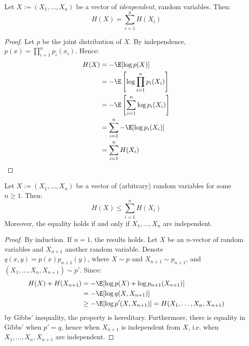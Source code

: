 \documentclass{../cs-classes/cs-classes}
\begin{document}
\begin{property}
    Let $X:=(X_1, \dots, X_n)$ be a vector of \emph{idenpendent}, random variables. Then:
    \begin{equation}
        H(X)=\sum_{i=1}^n H(X_i)
    \end{equation}
\end{property}

\begin{proof}
    Let $p$ be the joint distribution of $X$. By independence, $p(x)=\prod_{i=1}^n p_i(x_i)$. Hence:
    \begin{equation*}
        \begin{aligned}
            H(X)&=-\E[\log p(X)]\\
            &=-\E\left[\log\prod_{i=1}^n p_i(X_i)\right]\\
            &=-\E\left[\sum_{i=1}^n\log p_i(X_i)\right]\\
            &=\sum_{i=1}^n-\E[\log p_i(X_i)]\\
            &=\sum_{i=1}^n H(X_i)
        \end{aligned}
    \end{equation*}
\end{proof}

\begin{property}
    Let $X:=(X_1, \dots, X_n)$ be a vector of (arbitrary) random variables for some $n\geq 1$. Then:
    \begin{equation}
        H(X)\leq \sum_{i=1}^n H(X_i)
    \end{equation}
    Moreover, the equality holds if and only if $X_1, \dots, X_n$ are independent.
\end{property}

\begin{proof}
    By induction. If $n=1$, the results holds. Let $X$ be an $n$-vector of random variables and $X_{n+1}$ another random variable. Denote $q(x, y)=p(x)p_{n+1}(y)$, where $X\sim p$ and $X_{n+1}\sim p_{n+1}$, and $(X_1, \dots, X_n, X_{n+1})\sim p'$. Since:
    \begin{equation*}
        \begin{aligned}
            H(X) + H(X_{n+1}) &= -\E[\log p(X)+\log p_{n+1}(X_{n+1})]\\
            &=-\E[\log q(X, X_{n+1})]\\
            &\geq -\E[\log p'(X, X_{n+1})] = H(X_1, \dots, X_n, X_{n+1})
        \end{aligned}
    \end{equation*}
    by Gibbs' inequality, the property is hereditary. Furthermore, there is equality in Gibbs' when $p'=q$, hence when $X_{n+1}$ is independent from $X$, i.e. when $X_1, \dots, X_n, X_{n+1}$ are independent.
\end{proof}
\end{document}
